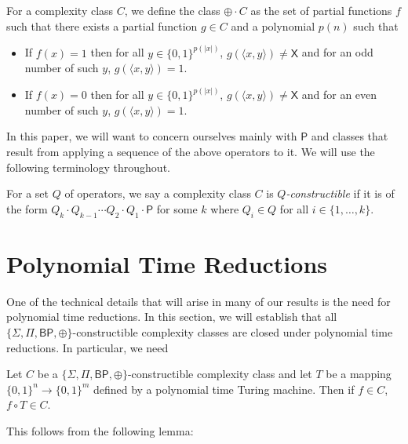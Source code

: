 \documentclass[11pt]{article}
\newcommand{\bp}{\textsf{BP}}
\newcommand{\parity}{\oplus}
\newcommand{\p}{\textsf{P}}
\newcommand{\x}{\textsf{X}}
\begin{document}
\begin{definition}\label{opparity}
For a complexity class $C$, we define the class $\parity\cdot C$ as the set of partial functions $f$ such that there exists a partial function $g \in C$ and a polynomial $p(n)$ such that
\begin{itemize}
\item If $f(x) = 1$ then for all $y \in \{0,1\}^{p(|x|)}$, $g(\langle x, y\rangle) \neq \x$ and for an odd number of such $y$, $g(\langle x,y\rangle) = 1$.
\item If $f(x) = 0$ then for all $y \in \{0,1\}^{p(|x|)}$, $g(\langle x, y\rangle) \neq \x$ and for an even number of such $y$, $g(\langle x,y\rangle) = 1$.
\end{itemize}
\end{definition}

In this paper, we will want to concern ourselves mainly with $\p$ and classes that result from applying a sequence of the above operators to it. We will use the following terminology throughout.
\begin{definition}\label{constructible}
For a set $Q$ of operators, we say a complexity class $C$ is \emph{$Q$-constructible} if it is of the form $Q_k \cdot Q_{k-1} \cdots Q_{2} \cdot Q_1 \cdot \p$ for some $k$ where $Q_i \in Q$ for all $i \in \{1,\ldots,k\}$.
\end{definition}

\section{Polynomial Time Reductions}

One of the technical details that will arise in many of our results is the need for polynomial time reductions. In this section, we will establish that all $\{\Sigma,\Pi,\bp,\parity\}$-constructible complexity classes are closed under polynomial time reductions. In particular, we need

\begin{prop}
Let $C$ be a $\{\Sigma,\Pi,\bp,\parity\}$-constructible complexity class and let $T$ be a mapping $\{0,1\}^n \to \{0,1\}^m$ defined by a polynomial time Turing machine. Then if $f \in C$, $f\circ T \in C$.
\end{prop}

This follows from the following lemma:
\end{document}
